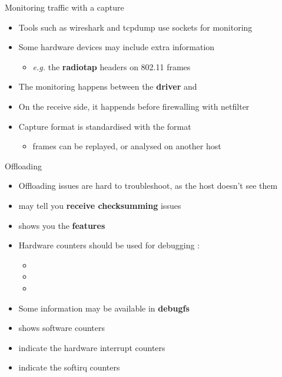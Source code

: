 \begin{frame}{Monitoring traffic with a capture}
	\begin{itemize}
		\item Tools such as wireshark and tcpdump use  sockets for monitoring 
		\item Some hardware devices may include extra information
			\begin{itemize}
				\item \textit{e.g.} the \textbf{radiotap} headers on 802.11 frames
			\end{itemize}
		\item The monitoring happens between the \textbf{driver} and 
		\item On the receive side, it happends before firewalling with netfilter
		\item Capture format is standardised with the  format
			\begin{itemize}
				\item frames can be replayed, or analysed on another host
			\end{itemize}
	\end{itemize}
\end{frame}

\begin{frame}{Offloading}
	\begin{itemize}
		\item Offloading issues are hard to troubleshoot, as the host doesn't see them
		\item {} may tell you \textbf{receive checksumming} issues
		\item {} shows you the \textbf{features}
		\item Hardware counters should be used for debugging :
			\begin{itemize}
				\item {}
				\item {}
				\item {}
			\end{itemize}
		\item Some information may be available in \textbf{debugfs}
		\item {} shows software counters
		\item {} indicate the hardware interrupt counters
		\item {} indicate the softirq counters
	\end{itemize}
\end{frame}

